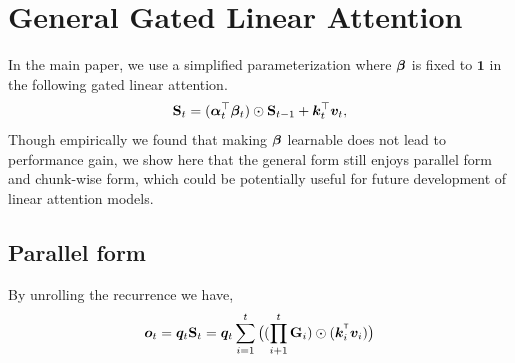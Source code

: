\section{General Gated Linear Attention}
\label{sec:ggla}

In the main paper, we use a simplified parameterization where ${\bm{\beta}}$ is fixed to $\mathbf{1}$ in the following gated linear attention.
%
\begin{align*}
{\mathbf{S}}_t = ({\bm{\alpha}}_t^{\top} {\bm{\beta}}_t) \odot {\mathbf{S}}_{t-1} + {\bm{k}}_t^{\top} {\bm{v}}_t,
\end{align*}
%
Though empirically we found that making ${\bm{\beta}}$ learnable does not lead to performance gain, we show here that the general form still enjoys parallel form and chunk-wise form, which could be potentially useful for future development of linear attention models.

\subsection{Parallel form}

By unrolling the recurrence we have,
%
\begin{align}
\vo_t = \vq_t \rmS_t 
= \vq_t \sum_{i=1}^{t} \big((\prod_{i+1}^{t} \rmG_{i}) \odot (\vk_i^{\intercal}\vv_i)\big) 
\end{align}
%
%
%
%
%
%
%
%
%

